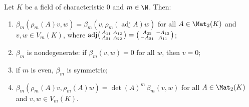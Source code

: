 Let $K$ be a field of characteristic $0$ and $m\in\N$. Then:
\begin{enumerate}[label=(\alph*)]
\item $\beta_m(\rho_m(A)v,w)=\beta_m(v,\rho_m(\operatorname{adj}A)w)$ for all $A\in\Mat_2(K)$ and $v,w\in V_m(K)$, where
  $\operatorname{adj}\begin{psmallmatrix}A_{11}&A_{12}\\A_{21}&A_{22}\end{psmallmatrix}=\begin{psmallmatrix}A_{22}&-A_{12}\\-A_{21}&A_{11}\end{psmallmatrix}$;
\item $\beta_m$ is nondegenerate: if $\beta_m(v,w)=0$ for all $w$, then $v=0$;
\item if $m$ is even, $\beta_m$ is symmetric;
\item $\beta_m(\rho_m(A)v,\rho_m(A)w)=\det(A)^m\,\beta_m(v,w)$ for all $A\in\Mat_2(K)$ and $v,w\in V_m(K)$.
\end{enumerate}

